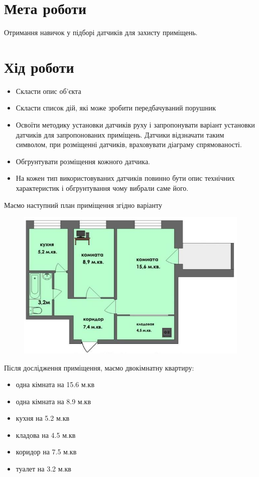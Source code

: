 \section{Мета роботи}
Отримання навичок у підборі датчиків для захисту приміщень.


\section{Хід роботи}
\begin{itemize}
  \item Скласти опис об'єкта
  \item Скласти список дій, які може зробити передбачуваний порушник
  \item Освоїти методику установки датчиків руху і запропонувати варіант установки датчиків для запропонованих приміщень. Датчики відзначати таким символом, при розміщенні датчиків, враховувати діаграму спрямованості.
  \item Обгрунтувати розміщення кожного датчика.
  \item На кожен тип використовуваних датчиків повинно бути опис технічних характеристик і обгрунтування чому вибрали саме його.
\end{itemize}

Маємо наступний план приміщення згідно варіанту

\begin{figure}[h!]
  \centering
  \includegraphics[width=17cm]{reports/info-protection/lab1/assets/flat.jpeg}
\end{figure}

\newpage
Після дослідження приміщення, маємо двокімнатну квартиру:

\begin{itemize}
  \item одна кімната на 15.6 м.кв
  \item одна кімната на 8.9 м.кв
  \item кухня на 5.2 м.кв
  \item кладова на 4.5 м.кв
  \item коридор на 7.5 м.кв
  \item туалет на 3.2 м.кв
\end{itemize}

